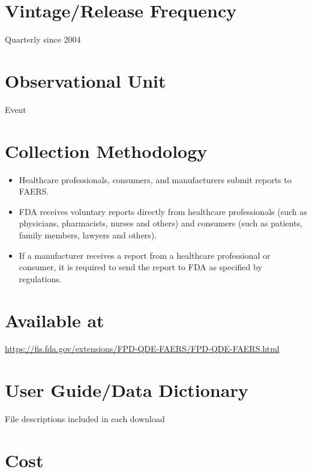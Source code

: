 \documentclass[
]{book}
\providecommand{\tightlist}{%
  \setlength{\itemsep}{0pt}\setlength{\parskip}{0pt}}
\begin{document}
\hypertarget{vintagerelease-frequency-25}{%
\section{Vintage/Release Frequency}\label{vintagerelease-frequency-25}}

Quarterly since 2004

\hypertarget{observational-unit-25}{%
\section{Observational Unit}\label{observational-unit-25}}

Event

\hypertarget{collection-methodology-25}{%
\section{Collection Methodology}\label{collection-methodology-25}}

\begin{itemize}
\tightlist
\item
  Healthcare professionals, consumers, and manufacturers submit reports to FAERS.
\item
  FDA receives voluntary reports directly from healthcare professionals (such as physicians, pharmacists, nurses and others) and consumers (such as patients, family members, lawyers and others).
\item
  If a manufacturer receives a report from a healthcare professional or consumer, it is required to send the report to FDA as specified by regulations.
\end{itemize}

\hypertarget{available-at-25}{%
\section{Available at}\label{available-at-25}}

\url{https://fis.fda.gov/extensions/FPD-QDE-FAERS/FPD-QDE-FAERS.html}

\hypertarget{user-guidedata-dictionary-25}{%
\section{User Guide/Data Dictionary}\label{user-guidedata-dictionary-25}}

File descriptions included in each download

\hypertarget{cost-25}{%
\section{Cost}\label{cost-25}}
\end{document}

